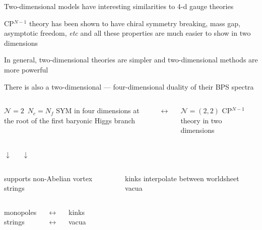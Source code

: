 \documentclass{beamer}
\begin{document}
\begin{frame}{}


	Two-dimensional models have interesting similarities to 4-d gauge theories
\vspace{0.4cm}

	CP$^{N-1}$ theory has been shown to have chiral symmetry breaking, mass gap,
	asymptotic freedom, {\it etc} and all these properties are much easier to show
	in two dimensions 
\vspace{0.4cm}

	In general, two-dimensional theories are simpler and two-dimensional methods
	are more powerful

\end{frame}


\begin{frame}{}

	There is also a two-dimensional --- four-dimensional duality of their BPS spectra

\vspace{7mm}
\begin{columns}[t]
	\column{5cm}
	$ \mathcal{N}=2 $\,  $ N_c = N_f $ SYM 
	in four dimensions at the root
	of the first baryonic Higgs branch

	\column{0.5cm}
	\vspace{2mm}
	$ \longleftrightarrow $

	\column{5cm}
	$ \mathcal{N}=(2,2) $ CP$^{N-1}$ theory
	in two dimensions
\end{columns}

\vspace{5mm}
\begin{columns}[t]
	\column{5.0cm}
		\centering
		$ \downarrow $

	\column{0.5cm}

	\column{5.0cm}
		\centering
		$ \downarrow $
\end{columns}

\vspace{5mm}
\begin{columns}[t]
	\column{5cm}
	supports non-Abelian
	vortex strings

	\column{0.5cm}

	\column{5cm}
	kinks interpolate
	between worldsheet vacua
\end{columns}

\vspace{7mm}
\begin{columns}[t]
	\column{5cm}
	\centering
	monopoles\\[7mm]
	strings

	\column{0.5cm}
	$ \longleftrightarrow $\\[7mm]
	$ \longleftrightarrow $
	
	\column{5cm}
	\centering
	kinks\\[7mm]
	vacua
\end{columns}


\end{frame}
\end{document}

